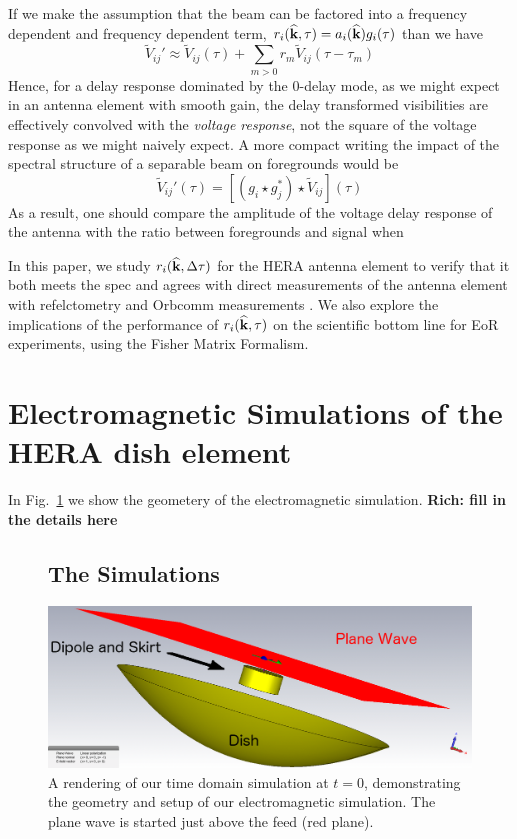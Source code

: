 \documentclass[onecolumn]{emulateapj}
\begin{document}
If we make the assumption that the beam can be factored into a frequency dependent and frequency dependent term, $r_i({\bf \widehat{k}},\tau) = a_i({\bf \widehat{k}}) g_i(\tau)$ than we have
\begin{equation}
\widetilde{V}_{ij}' \approx \widetilde{V}_{ij}(\tau) + \sum_{m>0} r_m \widetilde{V}_{ij}(\tau - \tau_m)
\end{equation}
 Hence, for a delay response dominated by the $0$-delay mode, as we might expect in an antenna element with smooth gain, the delay transformed visibilities are effectively convolved with the {\it voltage response}, not the square of the voltage response as we might naively expect. A more compact writing the impact of the spectral structure of a separable beam on foregrounds would be
 \begin{equation}
 	\widetilde{V}_{ij}'(\tau) = \left[ (g_i \star g_j^*) \star \widetilde{V}_{ij}\right](\tau)
 \end{equation}
 As a result, one should compare the amplitude of the voltage delay response of the antenna with the ratio between foregrounds and signal when 


 In this paper, we study $r_i({\bf \widehat{k}},\Delta \tau)$ for the HERA antenna element to verify that it both meets the spec and agrees with direct measurements of the antenna element with refelctometry \citep{Patra:2015} and Orbcomm measurements \citep{Neben:2015b}. We also explore the implications of the performance of $r_i({\bf \widehat{k}},\tau)$ on the scientific bottom line for EoR experiments, using the Fisher Matrix Formalism. 

\section{Electromagnetic Simulations of the HERA dish element}\label{sec:Simulations}
In Fig.~\ref{fig:SimulationSetup} we show the geometery of the electromagnetic simulation. {\bf Rich: fill in the details here}
\begin{figure}


\subsection{The Simulations}
\includegraphics[width=.5\textwidth]{figures/One_dish_Pfeed_render_pw_0deg.png}
\caption{A rendering of our time domain simulation at $t=0$, demonstrating the geometry and setup of our electromagnetic simulation. The plane wave is started just above the feed (red plane).}\label{fig:SimulationSetup}
\end{figure}
\end{document}

